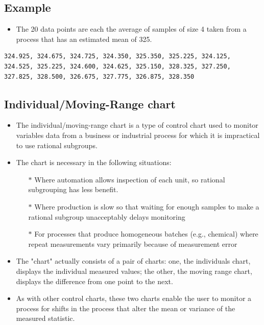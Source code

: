 \documentclass[]{article}
\begin{document}
\subsection{Example}

\begin{itemize}
\item The 20 data points are each the average of samples of size 4 taken from a process that has an estimated mean of 325.
\end{itemize}
\begin{framed}
\begin{verbatim}
324.925, 324.675, 324.725, 324.350, 325.350, 325.225, 324.125,
324.525, 325.225, 324.600, 324.625, 325.150, 328.325, 327.250,
327.825, 328.500, 326.675, 327.775, 326.875, 328.350
\end{verbatim}
\end{framed}
\newpage
\subsection{Individual/Moving-Range chart}
\begin{itemize}
\item The individual/moving-range chart is a type of control chart used to monitor variables data from a business or industrial process for which it is impractical to use rational subgroups.

\item The chart is necessary in the following situations:
\begin{itemize}
\item[$\ast$] Where automation allows inspection of each unit, so rational subgrouping has less benefit.
\item[$\ast$]Where production is slow so that waiting for enough samples to make a rational subgroup unacceptably delays monitoring
\item[$\ast$] For processes that produce homogeneous batches (e.g., chemical) where repeat measurements vary primarily because of measurement error
\end{itemize}
\item The "chart" actually consists of a pair of charts: one, the individuals chart, displays the individual measured values; the other, the moving range chart, displays the difference from one point to the next. 
\item As with other control charts, these two charts enable the user to monitor a process for shifts in the process that alter the mean or variance of the measured statistic.
\end{itemize}
\newpage
\end{document}
